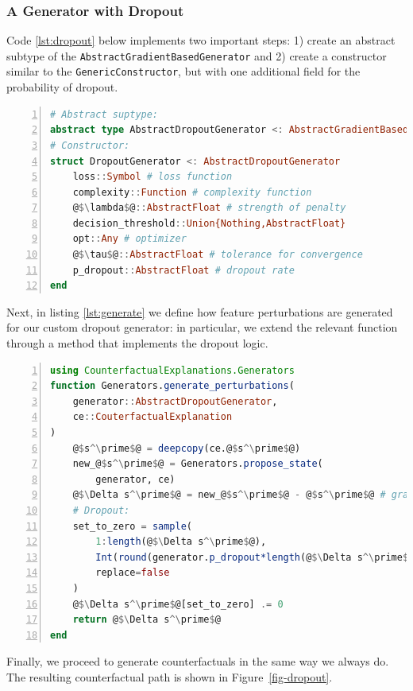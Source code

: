 \documentclass{juliacon}
\begin{document}
\hypertarget{a-generator-with-dropout}{%
\subsubsection{A Generator with
Dropout}\label{a-generator-with-dropout}}

Code \ref{lst:dropout} below implements two important steps: 1) create
an abstract subtype of the \texttt{AbstractGradientBasedGenerator} and
2) create a constructor similar to the \texttt{GenericConstructor}, but
with one additional field for the probability of dropout.

\begin{lstlisting}[language=Julia, escapechar=@, numbers=left, label={lst:dropout}, caption={Building a custom generator with dropout.}]
# Abstract suptype:
abstract type AbstractDropoutGenerator <: AbstractGradientBasedGenerator end
# Constructor:
struct DropoutGenerator <: AbstractDropoutGenerator
    loss::Symbol # loss function
    complexity::Function # complexity function
    @$\lambda$@::AbstractFloat # strength of penalty
    decision_threshold::Union{Nothing,AbstractFloat} 
    opt::Any # optimizer
    @$\tau$@::AbstractFloat # tolerance for convergence
    p_dropout::AbstractFloat # dropout rate
end
\end{lstlisting}

Next, in listing \ref{lst:generate} we define how feature perturbations
are generated for our custom dropout generator: in particular, we extend
the relevant function through a method that implements the dropout
logic.

\begin{lstlisting}[language=Julia, escapechar=@, numbers=left, label={lst:generate}, caption={Generating feature perturbations with dropout.}]
using CounterfactualExplanations.Generators
function Generators.generate_perturbations(
    generator::AbstractDropoutGenerator, 
    ce::CouterfactualExplanation
)
    @$s^\prime$@ = deepcopy(ce.@$s^\prime$@)
    new_@$s^\prime$@ = Generators.propose_state(
        generator, ce)
    @$\Delta s^\prime$@ = new_@$s^\prime$@ - @$s^\prime$@ # gradient step
    # Dropout:
    set_to_zero = sample(
        1:length(@$\Delta s^\prime$@),
        Int(round(generator.p_dropout*length(@$\Delta s^\prime$@))),
        replace=false
    )
    @$\Delta s^\prime$@[set_to_zero] .= 0
    return @$\Delta s^\prime$@
end
\end{lstlisting}

Finally, we proceed to generate counterfactuals in the same way we
always do. The resulting counterfactual path is shown in
Figure~\ref{fig-dropout}.
\end{document}
